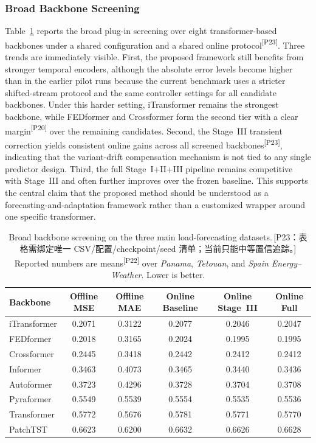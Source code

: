 ﻿\documentclass[journal]{IEEEtran}
\DeclareRobustCommand{\auditbad}[2]{{\color{auditred}#1}{\color{auditred}\textsuperscript{[#2]}}}
\DeclareRobustCommand{\auditnote}[2]{{\color{auditred}\footnotesize\,[#1：#2]}}
\begin{document}
\subsubsection{Broad Backbone Screening}
Table~\ref{tab:backbone_screening} reports the broad plug-in screening over eight transformer-based backbones under a \auditbad{shared configuration and a shared online protocol}{P23}. Three trends are immediately visible. First, the proposed framework still benefits from stronger temporal encoders, although the absolute error levels become higher than in the earlier pilot runs because the current benchmark uses a stricter shifted-stream protocol and the same controller settings for all candidate backbones. Under this harder setting, iTransformer remains the strongest backbone, while FEDformer and Crossformer form the second tier with a \auditbad{clear margin}{P20} over the remaining candidates. Second, the Stage~III transient correction yields \auditbad{consistent online gains across all screened backbones}{P23}, indicating that the variant-drift compensation mechanism is not tied to any single predictor design. Third, the full Stage~I+II+III pipeline remains competitive with Stage~III and often further improves over the frozen baseline. This supports the central claim that the proposed method should be understood as a forecasting-and-adaptation framework rather than a customized wrapper around one specific transformer.

\begin{table}[t]
\caption{Broad backbone screening on the three main load-forecasting datasets.\auditnote{P23}{表格需绑定唯一 CSV/配置/checkpoint/seed 清单；当前只能中等置信追踪。} \auditbad{Reported numbers are means}{P22} over \textit{Panama}, \textit{Tetouan}, and \textit{Spain Energy--Weather}. Lower is better.}
\label{tab:backbone_screening}
\centering
\begin{tabular}{lccccc}
\toprule
Backbone & Offline MSE & Offline MAE & Online Baseline & Online Stage~III & Online Full \\
\midrule
iTransformer & 0.2071 & 0.3122 & 0.2077 & 0.2046 & 0.2047 \\
FEDformer & 0.2018 & 0.3165 & 0.2024 & 0.1995 & 0.1995 \\
Crossformer & 0.2445 & 0.3418 & 0.2442 & 0.2412 & 0.2412 \\
Informer & 0.3463 & 0.4073 & 0.3465 & 0.3440 & 0.3436 \\
Autoformer & 0.3723 & 0.4296 & 0.3728 & 0.3704 & 0.3708 \\
Pyraformer & 0.5549 & 0.5539 & 0.5554 & 0.5535 & 0.5536 \\
Transformer & 0.5772 & 0.5676 & 0.5781 & 0.5771 & 0.5770 \\
PatchTST & 0.6623 & 0.6200 & 0.6632 & 0.6626 & 0.6628 \\
\bottomrule
\end{tabular}
\end{table}
\end{document}
